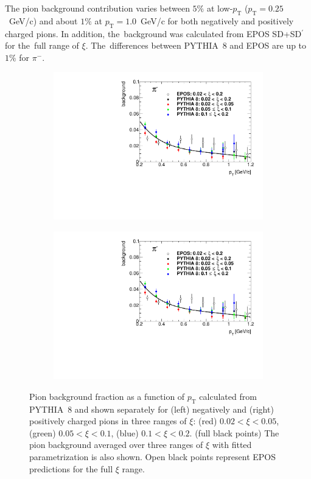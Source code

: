 The pion background contribution varies between $5\%$ at low-$p_\textrm{T}$  ($p_\textrm{T}=0.25$~GeV/c) and about $1\%$ at $p_\textrm{T}=1.0$~GeV/c for both negatively and positively charged pions. In addition, the~background was calculated from EPOS SD+SD$^\prime$ for the~full range of $\xi$. The~differences between PYTHIA~8 and EPOS are up to $1\%$ for $\pi^-$. 
\begin{figure}[htpb]
	\centering
	\begin{subfigure}{.49\textwidth}
		\includegraphics[width=\linewidth, page=1]{chapters/chrgSTAR/img/chargedBkg/bkg0max.pdf}
	\end{subfigure}
	\begin{subfigure}{.49\textwidth}
		\includegraphics[width=\linewidth, page=2]{chapters/chrgSTAR/img/chargedBkg/bkg0max.pdf}
	\end{subfigure}
	\caption{Pion background fraction as a function of $p_\textrm{T}$ calculated from PYTHIA~8 and shown separately for  (left) negatively  and (right)  positively charged pions in three ranges of $\xi$: (red) $0.02<\xi<0.05$,  (green) $0.05<\xi<0.1$, (blue) $0.1<\xi<0.2$.  (full black points) The pion background averaged over three ranges of $\xi$ with fitted parametrization is also shown. Open black points represent EPOS predictions for the full $\xi$ range.}
	\label{fig:bkg_pion}
\end{figure}

\FloatBarrier